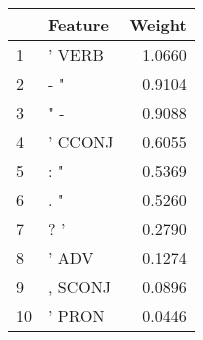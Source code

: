 \begin{tabular}{llr}
\toprule
{} &  Feature &  Weight \\
\midrule
1  &   ' VERB &  1.0660 \\
2  &      - " &  0.9104 \\
3  &      " - &  0.9088 \\
4  &  ' CCONJ &  0.6055 \\
5  &      : " &  0.5369 \\
6  &      . " &  0.5260 \\
7  &      ? ' &  0.2790 \\
8  &    ' ADV &  0.1274 \\
9  &  , SCONJ &  0.0896 \\
10 &   ' PRON &  0.0446 \\
\bottomrule
\end{tabular}
